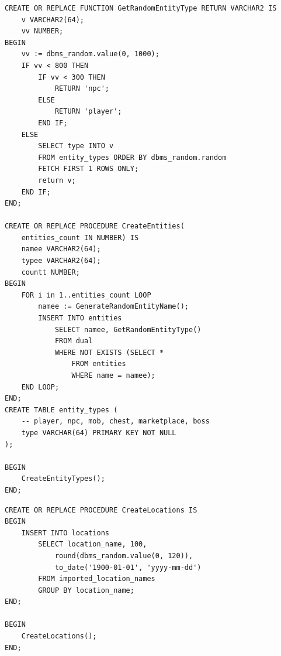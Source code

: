\documentclass[11pt]{article}
\numberwithin{figure}{subsection}
\begin{document}
	\begin{lstlisting}[caption={Wygenerowanie entity},captionpos=b]
CREATE OR REPLACE FUNCTION GetRandomEntityType RETURN VARCHAR2 IS
	v VARCHAR2(64);
	vv NUMBER;
BEGIN
	vv := dbms_random.value(0, 1000);
	IF vv < 800 THEN
		IF vv < 300 THEN
			RETURN 'npc';
		ELSE
			RETURN 'player';
		END IF;
	ELSE
		SELECT type INTO v
		FROM entity_types ORDER BY dbms_random.random
		FETCH FIRST 1 ROWS ONLY;
		return v;
	END IF;
END;

CREATE OR REPLACE PROCEDURE CreateEntities(
	entities_count IN NUMBER) IS
	namee VARCHAR2(64);
	typee VARCHAR2(64);
	countt NUMBER;
BEGIN
	FOR i in 1..entities_count LOOP
		namee := GenerateRandomEntityName();
		INSERT INTO entities
			SELECT namee, GetRandomEntityType()
			FROM dual
			WHERE NOT EXISTS (SELECT * 
				FROM entities
				WHERE name = namee);
	END LOOP;
END;
CREATE TABLE entity_types (
	-- player, npc, mob, chest, marketplace, boss
	type VARCHAR(64) PRIMARY KEY NOT NULL
);

BEGIN
	CreateEntityTypes();
END;
    \end{lstlisting}


	
	\begin{lstlisting}[caption={Wygenerowanie lokacji ze zbioru nazw
	miejscowości z imported\_location\_names},captionpos=b]
CREATE OR REPLACE PROCEDURE CreateLocations IS
BEGIN
	INSERT INTO locations
		SELECT location_name, 100,
			round(dbms_random.value(0, 120)),
			to_date('1900-01-01', 'yyyy-mm-dd')
		FROM imported_location_names
		GROUP BY location_name;
END;

BEGIN
	CreateLocations();
END;
    \end{lstlisting}
\end{document}
